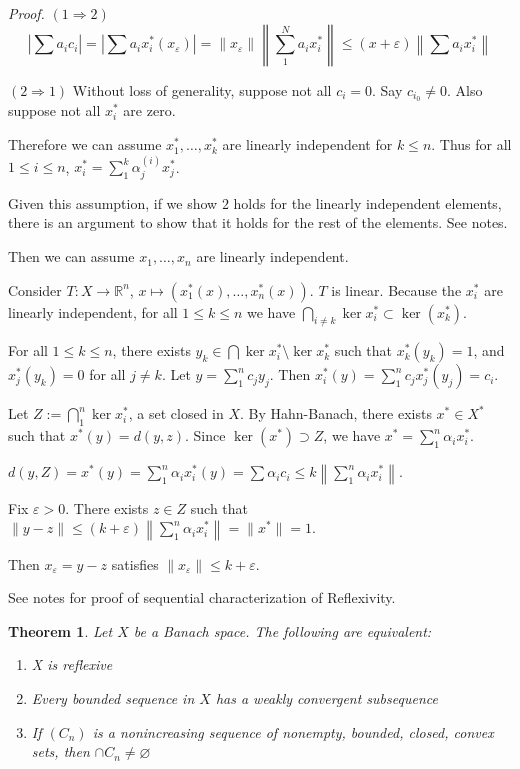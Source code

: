 \documentclass[11pt, reqno]{article}
\theoremstyle{plain}
\newtheorem*{theorem}{Theorem}
\theoremstyle{definition}
\theoremstyle{remark}
\renewcommand{\epsilon}{\varepsilon}
\renewcommand{\emptyset}{\varnothing}
\newcommand{\RR}{\mathbb{R}}
\begin{document}
\textit{Proof.} $(1 \Rightarrow 2)$
\[
    \left|\sum a_i c_i\right| = \left| \sum a_i x_i^*(x_\epsilon)\right| = \|x_\epsilon\|\left\|\sum_1^N a_i x_i^*\right\|
    \leq (x + \epsilon)\left\|\sum a_i x_i^*\right\|
\]

$(2 \Rightarrow 1)$ Without loss of generality, suppose not all $c_i = 0$. Say $c_{i_0} \neq 0$. Also suppose 
not all $x_i^*$ are zero. 

Therefore we can assume $x_1^*, \dots, x_k^*$ are linearly independent for $k \leq n$. Thus for all $1 \leq i \leq n$,
$x_i^* = \sum_1^k \alpha_j^{(i)} x_j^*$.

Given this assumption, if we show $2$ holds for the linearly independent elements, there is an argument to show
that it holds for the rest of the elements. See notes.

Then we can assume $x_1, \dots, x_n$ are linearly independent. 

Consider $T: X \rightarrow \RR^n$, $x \mapsto (x_1^*(x), \dots, x_n^*(x))$. $T$ is linear. Because the $x_i^*$ are linearly
independent, for all $1 \leq k \leq n$ we have $\bigcap_{i \neq k} \ker x_i^* \subset \ker(x_k^*)$. 

For all $1 \leq k \leq n$, there exists $y_k \in \bigcap \ker x_i^* \setminus \ker x_k^*$ such that $x_k^*(y_k) = 1$,
and $x_j^*(y_k) = 0$ for all $j \neq k$. Let $y = \sum_1^n c_j y_j$. Then $x_i^*(y) = \sum_1^n c_j x_j^*(y_j) = c_i$.

Let $Z := \bigcap_1^n \ker x_i^*$, a set closed in $X$. By Hahn-Banach, there exists $x^* \in X^*$ such that 
$x^*(y) = d(y,z)$. Since $\ker(x^*) \supset Z$, we have $x^* = \sum_1^n \alpha_i x_i^*$. 

$d(y,Z) = x^*(y) = \sum_1^n \alpha_i x_i^*(y) = \sum \alpha_i c_i \leq k\left\|\sum_1^n \alpha_i x_i^*\right\|$.

Fix $\epsilon > 0$. There exists $z \in Z$ such that $\|y - z\| \leq (k + \epsilon)\left\|\sum_1^n \alpha_i x_i^*\right\| = \|x^*\| = 1$.

Then $x_\epsilon = y - z$ satisfies $\|x_\epsilon\| \leq k + \epsilon$.

See notes for proof of sequential characterization of Reflexivity.

\begin{theorem}
    Let $X$ be a Banach space. The following are equivalent:
    \begin{enumerate}
        \item X is reflexive
        \item Every bounded sequence in $X$ has a weakly convergent subsequence 
        \item If $(C_n)$ is a nonincreasing sequence of nonempty, bounded, closed, convex sets, 
        then $\cap C_n \neq \emptyset$
    \end{enumerate}
\end{theorem}
\end{document}
